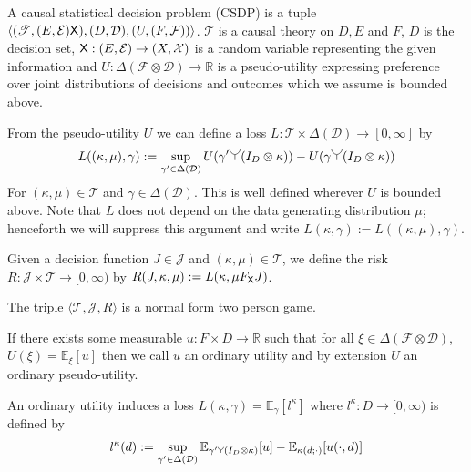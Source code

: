 \begin{definition}\label{def:CSDP}
A causal statistical decision problem (CSDP) is a tuple $\langle (\mathscr{T}, (E,\mathcal{E}) \mathsf{X}), (D,\mathcal{D}), (U,(F,\mathcal{F})) \rangle$. $\mathscr{T}$ is a causal theory on $D, E$ and $F$, $D$ is the decision set, $\mathsf{X}:(E,\mathcal{E})\to (X,\mathcal{X})$ is a random variable representing the given information and $U:\Delta(\mathcal{F}\otimes \mathcal{D})\to \mathbb{R}$ is a pseudo-utility expressing preference over joint distributions of decisions and outcomes which we assume is bounded above.

From the pseudo-utility $U$ we can define a loss $L:\mathscr{T}\times\Delta(\mathcal{D})\to [0,\infty]$ by
\begin{align}
    L((\kappa,\mu),\gamma) := \sup_{\gamma'\in\Delta(\mathcal{D})} U(\gamma'\splitter{0.15}(I_D\otimes \kappa)) - U(\gamma\splitter{0.15}(I_D\otimes \kappa))\label{eq:canonical_loss}
\end{align}
For $(\kappa,\mu)\in \mathscr{T}$ and $\gamma\in \Delta(\mathcal{D})$. This is well defined wherever $U$ is bounded above. Note that $L$ does not depend on the data generating distribution $\mu$; henceforth we will suppress this argument and write $L(\kappa,\gamma):= L((\kappa,\mu),\gamma)$.

Given a decision function $J\in\mathscr{J}$ and $(\kappa,\mu)\in \mathscr{T}$, we define the risk $R:\mathscr{J}\times \mathscr{T}\to [0,\infty)$ by $R(J,\kappa,\mu) := L(\kappa,\mu F_{\mathsf{X}} J)$.

The triple $\langle \mathscr{T}, \mathscr{J}, R\rangle$ is a normal form two person game.

If there exists some measurable $u:F\times D\to \mathbb{R}$ such that for all $\xi\in \Delta(\mathcal{F}\otimes\mathcal{D})$, $U(\xi)=\mathbb{E}_{\xi}[u]$ then we call $u$ an ordinary utility and by extension $U$ an ordinary pseudo-utility.

An ordinary utility induces a loss $L(\kappa,\gamma) = \mathbb{E}_{\gamma}[l^\kappa]$
where $l^\kappa:D\to [0,\infty)$ is defined by
\begin{align}
    l^\kappa(d) := \sup_{\gamma'\in \Delta(\mathcal{D})} \mathbb{E}_{\gamma'\splitter{0.08}(I_D\otimes \kappa)}[u] - \mathbb{E}_{\kappa(d;\cdot)}[u(\cdot,d)]\label{eq:induced_l}
\end{align}
\end{definition}


